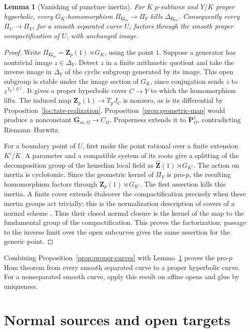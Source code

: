\documentclass[11pt,a4paper]{article}
\numberwithin{equation}{section}
\theoremstyle{plain}
\newtheorem{lemma}[theorem]{Lemma}
\theoremstyle{definition}
\theoremstyle{remark}
\newcommand{\Zp}{\mathbf Z_p}
\newcommand{\Gm}{\mathbf G_m}
\newcommand{\PP}{\mathbf P}
\newcommand{\etale}{\'etale}
\begin{document}
\begin{lemma}[Vanishing of puncture inertia]
\label{lem:puncture}
For $K$ $p$-subtame and $Y/K$ proper hyperbolic, every
$G_K$-homomorphism $\Pi_{\Gm}\to\Pi_Y$ kills $\Delta_{\Gm}$.
Consequently every $\Pi_U\to\Pi_Y$, for a smooth separated curve $U$, factors
through the smooth proper compactification of $U$, with unchanged image.
\end{lemma}
\begin{proof}
Write $\Pi_{\Gm}=\Zp(1)\rtimes G_K$, using the point $1$.
Suppose a generator has nontrivial image $z\in\Delta_Y$. Detect $z$
in a finite arithmetic quotient and take the inverse image in
$\Delta_Y$ of the cyclic subgroup generated by its image. This open
subgroup is stable under the image section of $G_K$, since conjugation
sends $z$ to $z^{\chi_p(g)}$. It gives a proper hyperbolic cover $C\to Y$
to which the homomorphism lifts. The induced map
$\Zp(1)\to T_pJ_C$ is nonzero, as is its differential by
Proposition~\ref{loc:tate-realization}. Proposition~\ref{prop:geometric-map}
would produce a nonconstant $\mathbf G_{m,\Omega}\to C_\Omega$. Properness extends
it to $\PP^1_\Omega$, contradicting Riemann--Hurwitz.

For a boundary point of $U$, first make the point rational over a finite
extension $K'/K$. A parameter and a compatible system of its roots give
a splitting of the decomposition group of the henselian local field
as $\widehat{\mathbf Z}(1)\rtimes G_{K'}$.
The action on inertia is cyclotomic. Since the geometric kernel of
$\Pi_Y$ is pro-$p$, the resulting homomorphism factors through
$\Zp(1)\rtimes G_{K'}$. The first assertion kills this inertia.
A finite cover extends \etale over the compactification precisely when
these inertia groups act trivially: this is the normalization
description of covers of a normal scheme
\cite[Expos\'e~I, Corollaire~10.3]{SGA1}.
Thus their closed normal closure is the kernel of the map to the
fundamental group of the compactification. This proves the
factorization; passage to the inverse limit over the open subcurves
gives the same assertion for the generic point.
\end{proof}

Combining Proposition~\ref{prop:proper-curves} with
Lemma~\ref{lem:puncture} proves the pro-$p$ Hom theorem from every smooth
separated curve to a proper hyperbolic curve. For a nonseparated smooth
curve, apply this result on affine opens and glue by uniqueness.

\section{Normal sources and open targets}
\label{sec:global}
\end{document}
